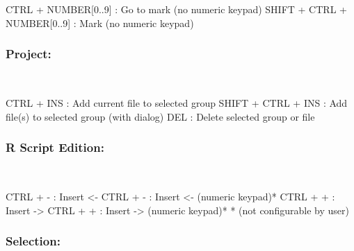 \vspace{-0.5cm}
\begin{Rtables}[caption={[Marks and go to marks keyboard shortcuts]
    Marks and go to marks keyboard shortcuts},
  label=hotkey:marks]
  CTRL  + NUMBER[0..9]        : Go to mark (no numeric keypad)
  SHIFT + CTRL + NUMBER[0..9] : Mark (no numeric keypad)
\end{Rtables}


\subsubsection{Project:}\\

\vspace{-0.5cm}
\begin{Rtables}[caption={[Project keyboard shortcuts]
    Project keyboard shortcuts},
  label=hotkey:project]
  CTRL  + INS        : Add current file to selected group
  SHIFT + CTRL + INS : Add file(s) to selected group (with dialog)
  DEL                : Delete selected group or file
\end{Rtables}


\subsubsection{R Script Edition:}\\

\vspace{-0.5cm}
\begin{Rtables}[caption={[R script edition keyboard shortcuts]
    R script edition keyboard shortcuts},
  label=hotkey:rscript]
  CTRL + - : Insert <-
  CTRL + - : Insert <-  (numeric keypad)*
  CTRL + + : Insert ->
  CTRL + + : Insert ->  (numeric keypad)*
  * (not configurable by user)
\end{Rtables}


\newpage
\subsubsection{Selection:}\\

